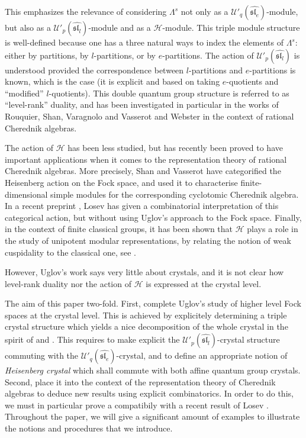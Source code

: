 \documentclass[twoside,12pt]{amsart}
\theoremstyle{plain}
\newcommand{\cH}{\mathcal{H}}
\newcommand{\La}{\Lambda}
\newcommand{\Ue}{\mathcal{U}'_q (\widehat{\mathfrak{sl}_e})}
\newcommand{\Ul}{\mathcal{U}'_p (\widehat{\mathfrak{sl}_l})}
\theoremstyle{remark}
\begin{document}
This emphasizes the relevance of considering $\La^s$ not only as a $\Ue$-module, but also
as a $\Ul$-module and as a $\cH$-module.
This triple module structure is well-defined because one has a three natural ways to index
the elements of $\La^s$: either by partitions, by $l$-partitions, or by $e$-partitions.
The action of $\Ul$ is understood provided the correspondence between $l$-partitions and $e$-partitions
is known, which is the case (it is explicit and based on taking $e$-quotients and ``modified'' $l$-quotients).
This double quantum group structure is referred to as ``level-rank'' duality, and
has been investigated in particular in the works of Rouquier, Shan, Varagnolo and Vasserot \cite{RSVV2016} and Webster \cite{Webster2013a}
in the context of rational Cherednik algebras.

The action of $\cH$ has been less studied, but has recently been proved to have important applications
when it comes to the representation theory of rational Cherednik algebras.
More precisely, Shan and Vasserot \cite{ShanVasserot2012} have categorified the Heisenberg action on the Fock space, and used it
to characterise finite-dimensional simple modules for the corresponding cyclotomic Cherednik algebra.
In a recent preprint \cite{Losev2015}, Losev has given a combinatorial interpretation of this categorical action,
but without using Uglov's approach to the Fock space.
Finally, in the context of finite classical groups,
it has been shown that $\cH$ plays a role in the study of unipotent modular representations,
by relating the notion of weak cuspidality to the classical one, see \cite[Section 5]{DudasVaragnoloVasserot2016}.

However, Uglov's work says very little about crystals, and it is not clear 
how level-rank duality nor the action of $\cH$ is expressed at the crystal level.

\medskip

The aim of this paper two-fold.
First, complete Uglov's study of higher level Fock spaces at the crystal level.
This is achieved by explicitely determining a triple crystal structure which yields a nice
decomposition of the whole crystal in the spirit of \cite[Proposition 4.6]{Uglov1999} and
\cite[Theorem 4.8]{Uglov1999}.
This requires to make explicit the $\Ul$-crystal structure commuting with the $\Ue$-crystal,
and to define an appropriate notion of \textit{Heisenberg crystal} which shall commute
with both affine quantum group crystals.
Second, place it into the context of the representation theory of Cherednik algebras to deduce new results
using explicit combinatorics.
In order to do this, we must in particular prove a compatibily with a recent result of Losev \cite{Losev2015}.
Throughout the paper, we will give a significant amount of examples to illustrate the notions
and procedures that we introduce.
\end{document}
